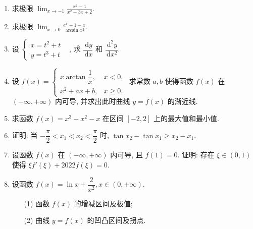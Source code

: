 \documentclass{hfutexam}
\newcommand{\diff}{\,\mathrm{d}}
\begin{document}
\begin{enumerate}
\item 求极限 $\displaystyle\lim_{x\to-1}\frac{x^2-1}{x^2+3x+2}$.
\item 求极限 $\displaystyle\lim_{x\to0}\frac{e^x-1-x}{\arcsin x^2}$.
\item 设 $\begin{cases}x=t^2+t&\\y=t^3+t&\end{cases}$, 求 $\dfrac{\diff y}{\diff x}$ 和 $\dfrac{\diff^2 y}{\diff x^2}$.
\item 设 $f(x)=\begin{cases}x\arctan\dfrac1x,&x<0,\\x^2+ax+b,&x\ge0.\end{cases}$
求常数 $a,b$ 使得函数 $f(x)$ 在 $(-\infty,+\infty)$ 内可导, 并求出此时曲线 $y=f(x)$ 的渐近线.
\item	求函数 $f(x)=x^3-x^2-x$ 在区间 $[-2,2]$ 上的最大值和最小值.
\item 证明: 当 $-\dfrac\pi2<x_1<x_2<\dfrac\pi2$ 时, $\tan x_2-\tan x_1\ge x_2-x_1$.
\item 设函数 $f(x)$ 在 $(-\infty,+\infty)$ 内可导, 且 $f(1)=0$.
证明: 存在 $\xi\in(0,1)$ 使得 $\xi f'(\xi)+2022f(\xi)=0$.
\item 设函数 $f(x)=\ln x+\dfrac2{x^2}, x\in(0,+\infty)$. 
\begin{enumerate}
\item[(1)] 函数 $f(x)$ 的增减区间及极值;
\item[(2)] 曲线 $y=f(x)$ 的凹凸区间及拐点.
\end{enumerate}
\end{enumerate}
\end{document}
